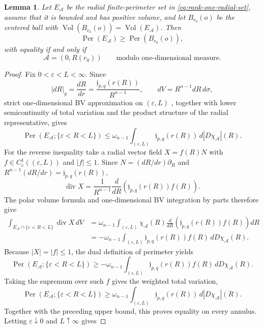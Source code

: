 \documentclass[11pt,reqno]{amsart}
\numberwithin{equation}{section}
\newtheorem{lemma}[theorem]{Lemma}
\theoremstyle{definition}
\theoremstyle{remark}
\newcommand{\Vol}{\operatorname{Vol}}
\newcommand{\Per}{\operatorname{Per}}
\begin{document}
\begin{lemma}
\label{lem:rank-one-endpoint-comparison}
Let $E_{\mathscr A}$ be the radial finite-perimeter set in
\eqref{eq:rank-one-radial-set}, assume that it is bounded and has positive
volume, and let $B_{r_0}(o)$ be the centered ball with
$\Vol(B_{r_0}(o))=\Vol(E_{\mathscr A})$.  Then
\[
 \Per(E_{\mathscr A})\ge\Per(B_{r_0}(o)),
\]
with equality if and only if
\begin{equation}
 \mathscr A=(0,R(r_0))
 \qquad\text{modulo one-dimensional measure}.
 \label{eq:rank-one-endpoint-equality}
\end{equation}
\end{lemma}

\begin{proof}
Fix $0<\varepsilon<L<\infty$.  Since
\[
 |dR|_g=\frac{dR}{dr}
 =\frac{\mathfrak j_{p,q}(r(R))}{R^{n-1}},
 \qquad
 dV=R^{n-1}dR\,d\sigma,
\]
strict one-dimensional BV approximation on $(\varepsilon,L)$
\cite[Theorem~3.9]{AFP2000}, together with lower semicontinuity of total
variation and the product structure of the radial representative, gives
\[
 \Per(E_{\mathscr A};\{\varepsilon<R<L\})
 \le
 \omega_{n-1}\int_{(\varepsilon,L)}
 \mathfrak j_{p,q}(r(R))\,d|D\chi_{\mathscr A}|(R).
\]
For the reverse inequality take a radial vector field $X=f(R)N$ with
$f\in C_c^1((\varepsilon,L))$ and $|f|\le1$.  Since
$N=(dR/dr)\partial_R$ and
$R^{n-1}(dR/dr)=\mathfrak j_{p,q}(r(R))$,
\[
 \operatorname{div}X
 =\frac{1}{R^{n-1}}\frac{d}{dR}
 \left(\mathfrak j_{p,q}(r(R))f(R)\right).
\]
The polar volume formula and one-dimensional BV integration by parts therefore
give
\[
\begin{aligned}
\int_{E_{\mathscr A}\cap\{\varepsilon<R<L\}}
\operatorname{div}X\,dV
&=\omega_{n-1}
\int_{(\varepsilon,L)}
\chi_{\mathscr A}(R)
\frac{d}{dR}
\left(\mathfrak j_{p,q}(r(R))f(R)\right)dR\\
&=-\omega_{n-1}
\int_{(\varepsilon,L)}
\mathfrak j_{p,q}(r(R))f(R)\,dD\chi_{\mathscr A}(R).
\end{aligned}
\]
Because $|X|=|f|\le1$, the dual definition of perimeter yields
\[
\Per(E_{\mathscr A};\{\varepsilon<R<L\})
\ge
-\omega_{n-1}
\int_{(\varepsilon,L)}
\mathfrak j_{p,q}(r(R))f(R)\,dD\chi_{\mathscr A}(R).
\]
Taking the supremum over such $f$ gives the weighted total variation,
\[
\Per(E_{\mathscr A};\{\varepsilon<R<L\})
\ge
\omega_{n-1}\int_{(\varepsilon,L)}
\mathfrak j_{p,q}(r(R))\,d|D\chi_{\mathscr A}|(R).
\]
Together with the preceding upper bound, this proves equality on every annulus.
Letting $\varepsilon\downarrow0$ and $L\uparrow\infty$ gives

\end{proof}
\end{document}
